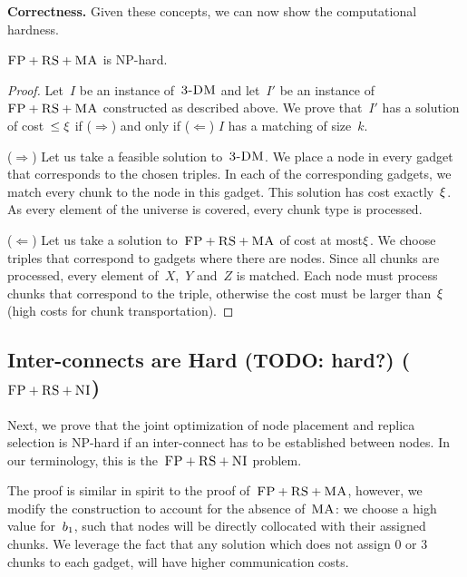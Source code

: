 \textbf{Correctness.}
Given these concepts, we can now show the computational hardness.
\begin{theorem}
$\textsc{FP}+\textsc{RS}+\textsc{MA}$ is NP-hard.
\end{theorem}
\begin{proof}
Let~$I$ be an instance of~$\textsc{3-DM}$ and let~$I'$ be an instance of
$\textsc{FP}+\textsc{RS}+\textsc{MA}$ constructed as described above. We prove that~$I'$ has a solution of cost~$\leq \xi$ if ($\Rightarrow$) and only if
($\Leftarrow$)
$I$ has a matching of size~$k$.

($\Rightarrow$) Let us take a feasible solution to~$\textsc{3-DM}$. We place a node in every
gadget that corresponds to the chosen triples. In each of the corresponding
gadgets, we match every chunk to the node in this gadget. This
solution has
cost exactly~$\xi$. As every element of the universe is covered, every
chunk type is processed.

($\Leftarrow$) Let us take a solution to~$\textsc{FP}+\textsc{RS}+\textsc{MA}$ of cost at most$\xi$. We
choose triples that correspond to gadgets where there are nodes. Since
all chunks are processed, every element of~$X$,~$Y$ and~$Z$ is matched. Each
node must process chunks that
correspond to the triple, otherwise the
cost must be larger than~$\xi$ (high costs for chunk
transportation).
\end{proof}


\subsection{Inter-connects are Hard (TODO: hard?) ($\textsc{FP}+\textsc{RS}+\textsc{NI}$)}\label{ssec:fprscc}


Next, we prove that the joint optimization of node placement and replica selection
is NP-hard if an inter-connect has to be established between nodes.
In our terminology, this is the~$\textsc{FP}+\textsc{RS}+\textsc{NI}$ problem.

The proof is similar in spirit to the proof of~$\textsc{FP}+\textsc{RS}+\textsc{MA}$, however,
we modify the construction to account for the absence of~$\textsc{MA}$:
we choose
a high value for~$b_1$, such that nodes will be directly collocated with
their assigned chunks. We leverage the fact that any solution which does not
assign 0 or 3 chunks to each gadget, will have higher communication costs.

